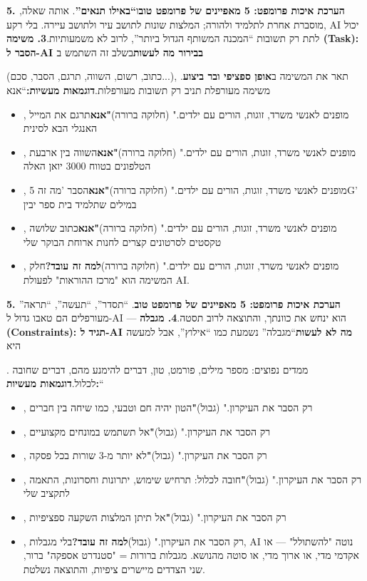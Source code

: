 \textbf{5. הערכת איכות פרומפט: 5 מאפיינים של פרומפט טוב}ו\textbf{“באילו תנאים”}. אותה שאלה, מוסברת אחרת לתלמיד ולהורה; המלצות שונות לתושב עיר ולתושב עיירה. בלי רקע, AI יכול לתת רק תשובות “המכנה המשותף הגדול ביותר”, לרוב לא משמעותיות.\textbf{3. משימה (Task): הסבר ל-AI בבירור מה לעשות}בשלב זה השתמש ב


(כתוב, רשום, השווה, תרגם, הסבר, סכם...), תאר את המשימה ב\textbf{אופן ספציפי ובר ביצוע}. משימה מעורפלת תניב רק תשובות מעורפלות.\textbf{דוגמאות מעשיות:}“אנא


\begin{itemize}
  \item , מופנים לאנשי משרד, זוגות, הורים עם ילדים." (חלוקה ברורה)\textbf{"אנא}תרגם את המייל האנגלי הבא לסינית
  \item , מופנים לאנשי משרד, זוגות, הורים עם ילדים." (חלוקה ברורה)\textbf{"אנא}השווה בין ארבעת הטלפונים בטווח 3000 יואן האלה
  \item , מופנים לאנשי משרד, זוגות, הורים עם ילדים." (חלוקה ברורה)\textbf{"אנא}הסבר 'מה זה 5G' במילים שתלמיד בית ספר יבין
  \item , מופנים לאנשי משרד, זוגות, הורים עם ילדים." (חלוקה ברורה)\textbf{"אנא}כתוב שלושה טקסטים לסרטונים קצרים לחנות ארוחת הבוקר שלי
  \item , מופנים לאנשי משרד, זוגות, הורים עם ילדים." (חלוקה ברורה)\textbf{למה זה עובד?}חלק המשימה הוא "מרכז ההוראות" לפעולת AI.
\end{itemize}

\textbf{5. הערכת איכות פרומפט: 5 מאפיינים של פרומפט טוב}. “תסדר”, “תעשה”, “תראה” מעורפלים הם טאבו גדול ל-AI — הוא ינחש את כוונתך, והתוצאה לרוב תסטה.\textbf{4. מגבלה (Constraints): תגיד ל-AI מה לא לעשות}“מגבלה” נשמעת כמו “אילוץ”, אבל למעשה היא


. ממדים נפוצים: מספר מילים, פורמט, טון, דברים להימנע מהם, דברים שחובה לכלול.\textbf{דוגמאות מעשיות:}“


\begin{itemize}
  \item , רק הסבר את העיקרון." (גבול)\textbf{"}הטון יהיה חם וטבעי, כמו שיחה בין חברים
  \item , רק הסבר את העיקרון." (גבול)\textbf{"}אל תשתמש במונחים מקצועיים
  \item , רק הסבר את העיקרון." (גבול)\textbf{"}לא יותר מ-3 שורות בכל פסקה
  \item , רק הסבר את העיקרון." (גבול)\textbf{"}חובה לכלול: תרחיש שימוש, יתרונות וחסרונות, התאמה לתקציב שלי
  \item , רק הסבר את העיקרון." (גבול)\textbf{"}אל תיתן המלצות השקעה ספציפיות
  \item , רק הסבר את העיקרון." (גבול)\textbf{למה זה עובד?}בלי מגבלות, AI נוטה "להשתולל" — או אקדמי מדי, או ארוך מדי, או סוטה מהנושא. מגבלות ברורות = "סטנדרט אספקה" ברור, שני הצדדים מיישרים ציפיות, והתוצאה נשלטת.
\end{itemize}

